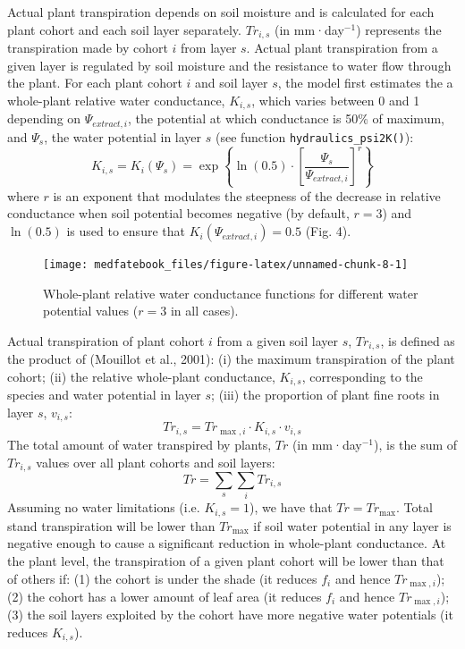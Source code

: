 \documentclass[]{book}
\begin{document}
Actual plant transpiration depends on soil moisture and is calculated for each plant cohort and each soil layer separately. \(Tr_{i,s}\) (in mm·day\(^{-1}\)) represents the transpiration made by cohort \(i\) from layer \(s\). Actual plant transpiration from a given layer is regulated by soil moisture and the resistance to water flow through the plant. For each plant cohort \(i\) and soil layer \(s\), the model first estimates the a whole-plant relative water conductance, \(K_{i,s}\), which varies between 0 and 1 depending on \(\Psi_{extract,i}\), the potential at which conductance is 50\% of maximum, and \(\Psi_s\), the water potential in layer \(s\) (see function \texttt{hydraulics\_psi2K()}):
\begin{equation}
K_{i,s}=K_{i}(\Psi_s) = \exp \left \{\ln{(0.5)}\cdot \left[ \frac{\Psi_s}{\Psi_{extract,i}} \right] ^r \right \} 
\end{equation}
where \(r\) is an exponent that modulates the steepness of the decrease in relative
conductance when soil potential becomes negative (by default, \(r = 3\)) and \(\ln(0.5)\)
is used to ensure that \(K_{i}(\Psi_{extract,i}) = 0.5\) (Fig. 4).

\begin{figure}

{\centering \texttt{[image: medfatebook\_files/figure-latex/unnamed-chunk-8-1]} 

}

\caption{Whole-plant relative water conductance functions for different water potential values ($r = 3$ in all cases).}\label{fig:unnamed-chunk-8}
\end{figure}

Actual transpiration of plant cohort \(i\) from a given soil layer \(s\), \(Tr_{i,s}\),
is defined as the product of (Mouillot et al., 2001): (i) the maximum transpiration
of the plant cohort; (ii) the relative whole-plant conductance, \(K_{i,s}\),
corresponding to the species and water potential in layer \(s\); (iii) the
proportion of plant fine roots in layer \(s\), \(v_{i,s}\):
\begin{equation}
Tr_{i,s} =  Tr_{\max,i} \cdot K_{i,s} \cdot v_{i,s}
\end{equation}
The total amount of water transpired by plants, \(Tr\) (in mm·day\(^{-1}\)), is the sum of
\(Tr_{i,s}\) values over all plant cohorts and soil layers:
\begin{equation}
Tr =\sum_{s}\sum_{i}{Tr_{i,s}}
\end{equation}
Assuming no water limitations (i.e. \(K_{i,s} = 1\)), we have that \(Tr = Tr_{\max}\).
Total stand transpiration will be lower than \(Tr_{\max}\) if soil water potential
in any layer is negative enough to cause a significant reduction in whole-plant
conductance. At the plant level, the transpiration of a given plant cohort will
be lower than that of others if: (1) the cohort is under the shade (it reduces
\(f_i\) and hence \(Tr_{\max,i}\)); (2) the cohort has a lower amount of leaf area
(it reduces \(f_i\) and hence \(Tr_{\max,i}\)); (3) the soil layers exploited by the
cohort have more negative water potentials (it reduces \(K_{i,s}\)).
\end{document}
